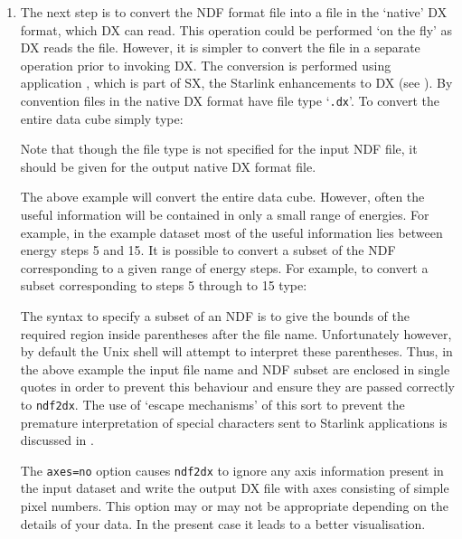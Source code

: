 \documentclass[twoside,11pt]{starlink}
\begin{document}
\begin{enumerate}
  \item The next step is to convert the NDF format file into a file
   in the `native' DX format, which DX can read.  This operation
   could be performed `on the fly' as DX reads the file.  However, it
   is simpler to convert the file in a separate operation prior to
   invoking DX.  The conversion is performed using application
   , which is part of SX, the
   Starlink enhancements to DX (see \cite{SUN203}).
   By convention files in the native DX format have file type `\texttt{.dx}'.
   To convert the entire data cube simply type:

\begin{terminalv}
\end{terminalv}

   Note that though the file type is not specified for the input NDF
   file, it should be given for the output native DX format file.

   The above example will convert the entire data cube.  However, often
   the useful information will be contained in only a small range of
   energies.  For example, in the example dataset most of the
   useful information lies between energy steps 5 and 15.  It is
   possible to convert a subset of the NDF corresponding to a given
   range of energy steps.  For example, to convert a subset
   corresponding to steps 5 through to 15 type:

\begin{terminalv}
\end{terminalv}

   The syntax to specify a subset of an NDF is to give the bounds of
   the required region inside parentheses after the file name.
   Unfortunately however, by default the Unix shell will attempt to
   interpret these parentheses.  Thus, in the above example the input
   file name and NDF subset are enclosed in single quotes in order to
   prevent this behaviour and ensure they are passed correctly to \texttt{ndf2dx}.  The use of `escape mechanisms'  of this sort to prevent the
   premature interpretation of special characters sent to Starlink
   applications is discussed in \cite{SC4}.

   The \texttt{axes=no} option causes \texttt{ndf2dx} to ignore any axis
   information present in the input dataset and write the output DX file
   with axes consisting of simple pixel numbers.  This option may or
   may not be appropriate depending on the details of your data.
   In the present case it leads to a better visualisation.


\end{enumerate}
\end{document}
